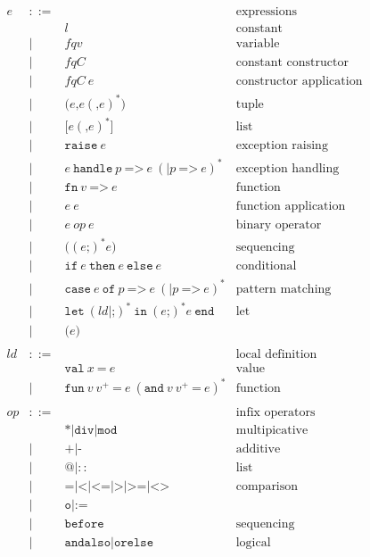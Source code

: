 \documentclass[12pt,a4paper]{book}
\newcommand{\gramsep}{|}
\begin{document}
\[
\begin{array}{lcll}

e & ::= & &\mbox{expressions}\\
&&l &\mbox{constant}\\
&|& \mathit{fqv}&\mbox{variable}\\
&|&\mathit{fqC}&\mbox{constant constructor}\\
&|&\mathit{fqC}\ e&\mbox{constructor application}\\
&|&\texttt{(}e\texttt{,}e(\texttt{,}e)^*\texttt{)}&\mbox{tuple}\\
&|&\texttt{[}e(\texttt{,}e)^*\texttt{]}&\mbox{list}\\
&|&\texttt{raise}\ e & \mbox{exception raising}\\
&|& e\ \texttt{handle}\ p\ \texttt{=>}\ e\ (\texttt{|}p\ \texttt{=>}\ e)^*&\mbox{exception handling}\\
&|& \texttt{fn}\ v\ \texttt{=>}\ e&\mbox{function}\\
&|& e\ e&\mbox{function application}\\
&|& e\ \mathit{op}\ e&\mbox{binary operator}\\
&|& \texttt{(}(e\texttt{;})^*e\texttt{)}&\mbox{sequencing}\\
&|& \texttt{if}\ e\ \texttt{then}\ e\ \texttt{else}\ e&\mbox{conditional}\\
&|& \texttt{case}\ e\ \texttt{of}\ p\ \texttt{=>}\ e\ (\texttt{|}p\ \texttt{=>}\ e)^*&\mbox{pattern matching}\\
&|& \texttt{let}\ (\mathit{ld}|\texttt{;})^*\ \texttt{in}\ (e\texttt{;})^*e\ \texttt{end}&\mbox{let}\\
&|&\texttt{(}e\texttt{)}\\\\

\mathit{ld} &::=& &\mbox{local definition}\\
&& \texttt{val}\ x\ \texttt{=}\ e&\mbox{value}\\
 &|&\texttt{fun}\ v\ v^+\ \texttt{=}\ e\ (\texttt{and}\ v\ v^+\ \texttt{=}\ e)^*&\mbox{function}\\\\

\mathit{op} &::=& &\mbox{infix operators}\\
&&\texttt{*}\gramsep \texttt{div}\gramsep \texttt{mod}&\mbox{multipicative}\\
&|& \texttt{+}\gramsep \texttt{-}&\mbox{additive} \\
&|&\texttt{@}\gramsep{::} & \mbox{list}\\
&|&\texttt{=} \gramsep \texttt{<}\gramsep \texttt{<=}\gramsep \texttt{>}\gramsep \texttt{>=} \gramsep\texttt{<>}&\mbox{comparison}\\
&|&\texttt{o}\gramsep \texttt{:=}\\
&|&\texttt{before}&\mbox{sequencing}\\
&|&\texttt{andalso} \gramsep \texttt{orelse}&\mbox{logical}
\end{array}
\]
\end{document}
